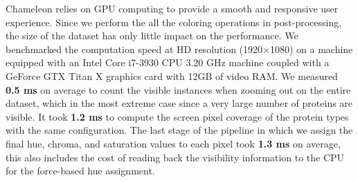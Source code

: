 \documentclass{egpubl}
\begin{document}
	Chameleon relies on GPU computing to provide a smooth and responsive user experience.
	Since we perform the all the coloring operations in post-processing, the size of the dataset has only little impact on the performance. 
	We benchmarked the computation speed at HD resolution (1920$\times$1080) on a machine equipped with an Intel Core i7-3930 CPU 3.20 GHz machine coupled with a GeForce GTX Titan X graphics card with 12GB of video RAM.
	We measured \textbf{0.5 ms} on average to count the visible instances when zooming out on the entire dataset, which in the most extreme case since a very large number of proteins are visible.	
	It took \textbf{1.2 ms} to compute the screen pixel coverage of the protein types with the same configuration.
	The last stage of the pipeline in which we assign the final hue, chroma, and saturation values to each pixel took \textbf{1.3 ms} on average, this also includes the cost of reading back the visibility information to the CPU for the force-based hue assignment.
		
\end{document}
